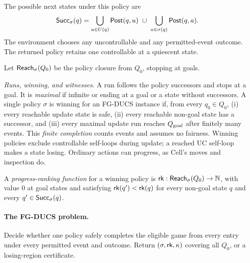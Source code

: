 The possible next states under this policy are
\begin{equation}
 \mathsf{Succ}_\sigma(q)=
 \bigcup_{u\in U(q)}\mathsf{Post}(q,u)
 \ \cup\
 \bigcup_{a\in\sigma(q)}\mathsf{Post}(q,a).
\label{eq:strategy-successors}
\end{equation}
The environment chooses any uncontrollable and any permitted-event outcome. The returned policy retains one controllable at a quiescent state.

Let $\mathsf{Reach}_\sigma(Q_0)$ be the policy closure from $Q_0$, stopping at goals. 

\emph{Runs, winning, and witnesses.}
A run follows the policy successors and stops at a goal. It is \emph{maximal} if infinite or ending at a goal or a state without successors. A single policy $\sigma$ is winning for an FG-DUCS instance if, from every $q_0\in Q_0$,
(i) every reachable update state is safe, (ii) every reachable non-goal state has a successor, and
(iii) every maximal update run reaches $Q_{\mathrm{goal}}$ after finitely many events.
This \emph{finite completion} counts events and assumes no fairness. Winning policies exclude controllable self-loops during update; a reached UC self-loop makes a state losing. Ordinary actions can progress, as Cell's moves and inspection do.

A \emph{progress-ranking function} for a winning policy is $\mathsf{rk}:\mathsf{Reach}_\sigma(Q_0)\to\mathbb N$, with value 0 at goal states and satisfying $\mathsf{rk}(q')<\mathsf{rk}(q)$ for every non-goal state $q$ and every
$q'\in \mathsf{Succ}_\sigma(q)$.

\paragraph{The FG-DUCS problem.}
Decide whether one policy safely completes the eligible game from every entry under every permitted event and outcome. Return $(\sigma,\mathsf{rk},\kappa)$ covering all $Q_0$, or a losing-region certificate.

